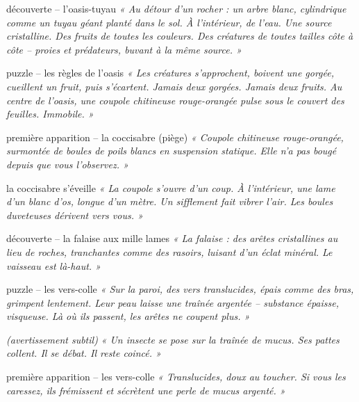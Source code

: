 \documentclass[10pt, a4paper]{article}
\begin{document}
\begin{obstaclebox}{découverte -- l'oasis-tuyau}
\textit{« Au détour d'un rocher : un arbre blanc, cylindrique comme un tuyau géant planté dans le sol. À l'intérieur, de l'eau. Une source cristalline. Des fruits de toutes les couleurs. Des créatures de toutes tailles côte à côte -- proies et prédateurs, buvant à la même source. »}
\end{obstaclebox}

\begin{puzzlebox}{puzzle -- les règles de l'oasis}
\textit{« Les créatures s'approchent, boivent une gorgée, cueillent un fruit, puis s'écartent. Jamais deux gorgées. Jamais deux fruits. Au centre de l'oasis, une coupole chitineuse rouge-orangée pulse sous le couvert des feuilles. Immobile. »}
\end{puzzlebox}

\begin{creaturebox}{première apparition -- la coccisabre (piège)}
\textit{« Coupole chitineuse rouge-orangée, surmontée de boules de poils blancs en suspension statique. Elle n'a pas bougé depuis que vous l'observez. »}
\end{creaturebox}

\begin{creaturebox}{la coccisabre s'éveille}
\textit{« La coupole s'ouvre d'un coup. À l'intérieur, une lame d'un blanc d'os, longue d'un mètre. Un sifflement fait vibrer l'air. Les boules duveteuses dérivent vers vous. »}
\end{creaturebox}

\begin{obstaclebox}{découverte -- la falaise aux mille lames}
\textit{« La falaise : des arêtes cristallines au lieu de roches, tranchantes comme des rasoirs, luisant d'un éclat minéral. Le vaisseau est là-haut. »}
\end{obstaclebox}

\begin{puzzlebox}{puzzle -- les vers-colle}
\textit{« Sur la paroi, des vers translucides, épais comme des bras, grimpent lentement. Leur peau laisse une traînée argentée -- substance épaisse, visqueuse. Là où ils passent, les arêtes ne coupent plus. »}

\textit{(avertissement subtil)} \textit{« Un insecte se pose sur la traînée de mucus. Ses pattes collent. Il se débat. Il reste coincé. »}
\end{puzzlebox}

\begin{creaturebox}{première apparition -- les vers-colle}
\textit{« Translucides, doux au toucher. Si vous les caressez, ils frémissent et sécrètent une perle de mucus argenté. »}
\end{creaturebox}
\end{document}
